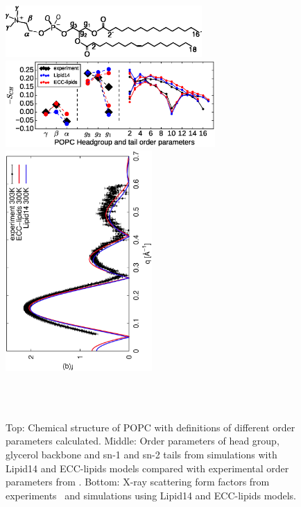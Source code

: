 \documentclass[aip,jcp,twocolumn]{revtex4}
\begin{document}
\begin{figure}[tbp]
  \centering
  \includegraphics[width=7.5cm]{../Fig/POPCstructure.eps}
  \includegraphics[width=8.0cm]{../Fig/ipython_nb/Order-parameters_exp-L14-ECCL17_q80_sig89.eps}
  \includegraphics[height=8.4cm,angle=-90]{../Fig/form-f_exp-l14-eccl17.eps}
  \caption{\label{simVSexpNOions}
    Top: Chemical structure of POPC with definitions of different order parameters calculated.
    Middle: Order parameters of head group, glycerol backbone and sn-1 and sn-2 tails  from simulations with Lipid14 \cite{dickson14} and ECC-lipids models
    compared with experimental order parameters from \cite{ferreira13}.
    Bottom: X-ray scattering form factors from experiments~\cite{Kucerka2011} and simulations using Lipid14 \cite{dickson14} and ECC-lipids models. 
    } 
   \\
   \\
\end{figure}
\end{document}
